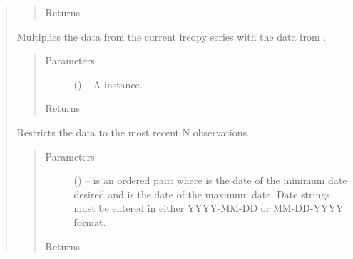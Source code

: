 \documentclass[letterpaper,10pt,openany,oneside,english]{sphinxmanual}
\begin{document}
\begin{fulllineitems}
\begin{quote}
\begin{fulllineitems}
\begin{quote}
\begin{description}
\item[{Returns}] \leavevmode


\end{description}\end{quote}

\end{fulllineitems}


\begin{fulllineitems}
\label{\detokenize{series_class:fredpy.series.times}}
Multiplies the data from the current fredpy series with the data from .
\begin{quote}\begin{description}
\item[{Parameters}] \leavevmode
{} ({\hyperref[\detokenize{series_class:fredpy.series}]{}}) -- A {\hyperref[\detokenize{series_class:fredpy.series}]{}} instance.

\item[{Returns}] \leavevmode
{\hyperref[\detokenize{series_class:fredpy.series}]{}}

\end{description}\end{quote}

\end{fulllineitems}


\begin{fulllineitems}
\label{\detokenize{series_class:fredpy.series.window}}
Restricts the data to the most recent N observations.
\begin{quote}\begin{description}
\item[{Parameters}] \leavevmode
{} (\href{https://docs.python.org/2/library/functions.html\#list}{}) -- is an ordered pair:  where  is the date of the minimum date desired and  is the date of the maximum date. Date strings must be entered in either YYYY-MM-DD or MM-DD-YYYY format.

\item[{Returns}] \leavevmode
{\hyperref[\detokenize{series_class:fredpy.series}]{}}

\end{description}\end{quote}

\end{fulllineitems}

\end{quote}

\end{fulllineitems}
\end{document}
